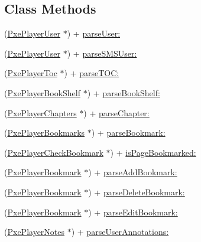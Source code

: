 \subsection*{Class Methods}
\begin{DoxyCompactItemize}
\item 
(\hyperlink{interface_pxe_player_user}{Pxe\-Player\-User} $\ast$) + \hyperlink{interface_pxe_player_parser_a04700412ca66562b50918b8f131d66d1}{parse\-User\-:}
\item 
(\hyperlink{interface_pxe_player_user}{Pxe\-Player\-User} $\ast$) + \hyperlink{interface_pxe_player_parser_ae2d862548ef0cba8acea7f1703908bb7}{parse\-S\-M\-S\-User\-:}
\item 
(\hyperlink{interface_pxe_player_toc}{Pxe\-Player\-Toc} $\ast$) + \hyperlink{interface_pxe_player_parser_a8b76b5a89da8ec6adac91d4806c56b0e}{parse\-T\-O\-C\-:}
\item 
(\hyperlink{interface_pxe_player_book_shelf}{Pxe\-Player\-Book\-Shelf} $\ast$) + \hyperlink{interface_pxe_player_parser_a1987022067a508c6101376e0d7e71283}{parse\-Book\-Shelf\-:}
\item 
(\hyperlink{interface_pxe_player_chapters}{Pxe\-Player\-Chapters} $\ast$) + \hyperlink{interface_pxe_player_parser_a384a201cc19f42d68661269791a38389}{parse\-Chapter\-:}
\item 
(\hyperlink{interface_pxe_player_bookmarks}{Pxe\-Player\-Bookmarks} $\ast$) + \hyperlink{interface_pxe_player_parser_a6fe369a588a15e46b23d58add69812f0}{parse\-Bookmark\-:}
\item 
(\hyperlink{interface_pxe_player_check_bookmark}{Pxe\-Player\-Check\-Bookmark} $\ast$) + \hyperlink{interface_pxe_player_parser_a36487d345e7be05028597aefd2dcf3c8}{is\-Page\-Bookmarked\-:}
\item 
(\hyperlink{interface_pxe_player_bookmark}{Pxe\-Player\-Bookmark} $\ast$) + \hyperlink{interface_pxe_player_parser_ad0a7596e410347020b20d874cea3ca22}{parse\-Add\-Bookmark\-:}
\item 
(\hyperlink{interface_pxe_player_bookmark}{Pxe\-Player\-Bookmark} $\ast$) + \hyperlink{interface_pxe_player_parser_a7db58c7822375ff104b2c93b27e3d21e}{parse\-Delete\-Bookmark\-:}
\item 
(\hyperlink{interface_pxe_player_bookmark}{Pxe\-Player\-Bookmark} $\ast$) + \hyperlink{interface_pxe_player_parser_ae0ecd8bdf21c9dba39c052e44507e520}{parse\-Edit\-Bookmark\-:}
\item 
(\hyperlink{interface_pxe_player_notes}{Pxe\-Player\-Notes} $\ast$) + \hyperlink{interface_pxe_player_parser_a61422ee637cb3a1ac1df021c13f9bfd4}{parse\-User\-Annotations\-:}

\end{DoxyCompactItemize}
